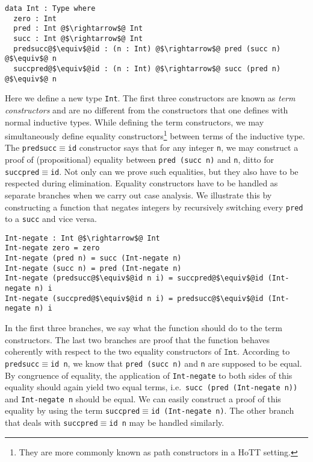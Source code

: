 \documentclass[12pt,twoside,maitrise]{dms}
\theoremstyle{definition}
\numberwithin{equation}{section}
\numberwithin{table}{chapter}
\numberwithin{figure}{chapter}
\newcommand\id[1] {\texttt{#1}}
\newcommand\fn[1] {\texttt{#1}}
\begin{document}
\begin{verbatim}
data Int : Type where
  zero : Int
  pred : Int @$\rightarrow$@ Int
  succ : Int @$\rightarrow$@ Int
  predsucc@$\equiv$@id : (n : Int) @$\rightarrow$@ pred (succ n) @$\equiv$@ n
  succpred@$\equiv$@id : (n : Int) @$\rightarrow$@ succ (pred n) @$\equiv$@ n
\end{verbatim}

Here we define a new type \id{Int}. The first three constructors are known as
\emph{term constructors} and are no different from the constructors that one
defines with normal inductive types. While defining the term constructors, we
may simultaneously define equality constructors\footnote{They are more commonly
known as path constructors in a HoTT setting.} between terms of the inductive
type. The \id{predsucc$\equiv$id} constructor says that for any integer \id{n},
we may construct a proof of (propositional) equality between \fn{pred (succ n)}
and \id{n}, ditto for \id{succpred$\equiv$id}. Not only can we prove such
equalities, but they also have to be respected during elimination. Equality
constructors have to be handled as separate branches when we carry out case
analysis. We illustrate this by constructing a function that negates integers by
recursively switching every \id{pred} to a \id{succ} and vice versa.

\begin{verbatim}
Int-negate : Int @$\rightarrow$@ Int
Int-negate zero = zero
Int-negate (pred n) = succ (Int-negate n)
Int-negate (succ n) = pred (Int-negate n)
Int-negate (predsucc@$\equiv$@id n i) = succpred@$\equiv$@id (Int-negate n) i
Int-negate (succpred@$\equiv$@id n i) = predsucc@$\equiv$@id (Int-negate n) i
\end{verbatim}

In the first three branches, we say what the function should do to the term
constructors. The last two branches are proof that the function behaves
coherently with respect to the two equality constructors of $\id{Int}$.
According to \fn{predsucc$\equiv$id n}, we know that \fn{pred (succ n)} and
\fn{n} are supposed to be equal. By congruence of equality, the application of
\id{Int-negate} to both sides of this equality should again yield two equal
terms, i.e.\ \fn{succ (pred (Int-negate n))} and \fn{Int-negate n} should be
equal. We can easily construct a proof of this equality by using the term
\fn{succpred$\equiv$id (Int-negate n)}. The other branch that deals with
\fn{succpred$\equiv$id n} may be handled similarly.
\end{document}
